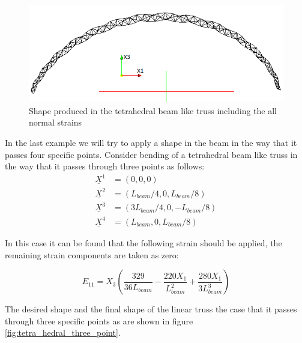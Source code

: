 \begin{figure}  
\centering
\includegraphics[width=6.0in]{./chap_5_active_trusses/images_linear_tetrahedral/tetra_hedral_arc_2_pi_shape_with_pressure.png}
\caption{Shape produced in the tetrahedral beam like truss including the all normal strains}
\label{fig:tetra_hedral_arc_2_pi_shape_with_pressure}
\end{figure} 

In the last example we will try to apply a shape in the beam in the way that it passes four specific points. Consider bending of a tetrahedral beam like truss in the way that it passes through three points as follows: 
\begin{equation}
\begin{aligned} 
\underline X ^1&=(0,0,0) \\
\underline X ^2&=(L_{beam}/4,0,L_{beam}/8) \\
\underline X ^3&=(3 L_{beam}/4,0,-L_{beam}/8) \\
\underline X ^4&=(L_{beam},0,L_{beam}/8)
\end{aligned}
\label{three_points:eqn}
\end{equation}

In this case it can be found that the following strain should be applied, the remaining strain components are taken as zero: 

\begin{equation}
E_{11}=X_3 \left(
\frac{329}{36L_{beam}} -
\frac{220 X_1}{L_{beam}^2} +
\frac{280 X_1}{ 3 L_{beam}^3}  \right)
\label{three_points_strain:eqn}
\end{equation}

The desired shape and the final shape of the linear truss the case that it passes through three specific points as are shown in figure \ref{fig:tetra_hedral_three_point}.

